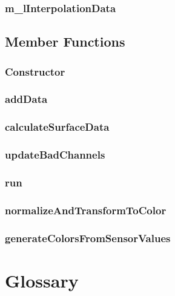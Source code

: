 \subsubsection{m\_lInterpolationData}

\subsection{Member Functions}

\subsubsection{Constructor}

\subsubsection{addData}

\subsubsection{calculateSurfaceData}

\subsubsection{updateBadChannels}

\subsubsection{run}

\subsubsection{normalizeAndTransformToColor}

\subsubsection{generateColorsFromSensorValues}

\clearpage

\section{Glossary}

